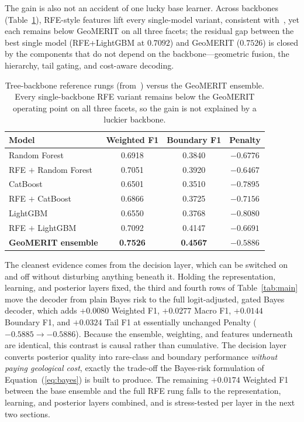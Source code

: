 \documentclass[bdcc,article,submit,pdftex,moreauthors]{Definitions/mdpi}
\begin{document}
The gain is also not an accident of one lucky base learner. Across backbones
(Table~\ref{tab:backbones}), RFE-style features lift every single-model variant, consistent
with~\cite{chen2026rfe}, yet each remains below GeoMERIT on all three facets; the residual gap
between the best single model (RFE+LightGBM at $0.7092$) and GeoMERIT ($0.7526$) is closed by
the components that do not depend on the backbone---geometric fusion, the hierarchy, tail
gating, and cost-aware decoding.

\begin{table}[H]
\caption{Tree-backbone reference rungs (from~\cite{chen2026rfe}) versus the GeoMERIT
ensemble. Every single-backbone RFE variant remains below the GeoMERIT operating point on
all three facets, so the gain is not explained by a luckier backbone.\label{tab:backbones}}
\begin{tabularx}{\textwidth}{Xccc}
\toprule
\textbf{Model} & \textbf{Weighted F1} & \textbf{Boundary F1} & \textbf{Penalty}\\
\midrule
Random Forest & 0.6918 & 0.3840 & $-0.6776$\\
RFE $+$ Random Forest & 0.7051 & 0.3920 & $-0.6467$\\
CatBoost & 0.6501 & 0.3510 & $-0.7895$\\
RFE $+$ CatBoost & 0.6866 & 0.3725 & $-0.7156$\\
LightGBM & 0.6550 & 0.3768 & $-0.8080$\\
RFE $+$ LightGBM & 0.7092 & 0.4147 & $-0.6691$\\
\textbf{GeoMERIT ensemble} & \textbf{0.7526} & \textbf{0.4567} & $\mathbf{-0.5886}$\\
\bottomrule
\end{tabularx}
\end{table}

The cleanest evidence comes from the decision layer, which can be switched on and off without
disturbing anything beneath it. Holding the representation, learning, and posterior layers
fixed, the third and fourth rows of Table~\ref{tab:main} move the decoder from plain Bayes risk
to the full logit-adjusted, gated Bayes decoder, which adds $+0.0080$ Weighted F1, $+0.0277$
Macro F1, $+0.0144$ Boundary F1, and $+0.0324$ Tail F1 at essentially unchanged Penalty
($-0.5885\to-0.5886$). Because the ensemble, weighting, and features underneath are identical,
this contrast is causal rather than cumulative. The decision layer converts posterior quality
into rare-class and boundary performance \emph{without paying geological cost}, exactly the
trade-off the Bayes-risk formulation of Equation~(\ref{eq:bayes}) is built to produce. The
remaining $+0.0174$ Weighted F1 between the base ensemble and the full RFE rung falls to the
representation, learning, and posterior layers combined, and is stress-tested per layer in the
next two sections.
\end{document}
